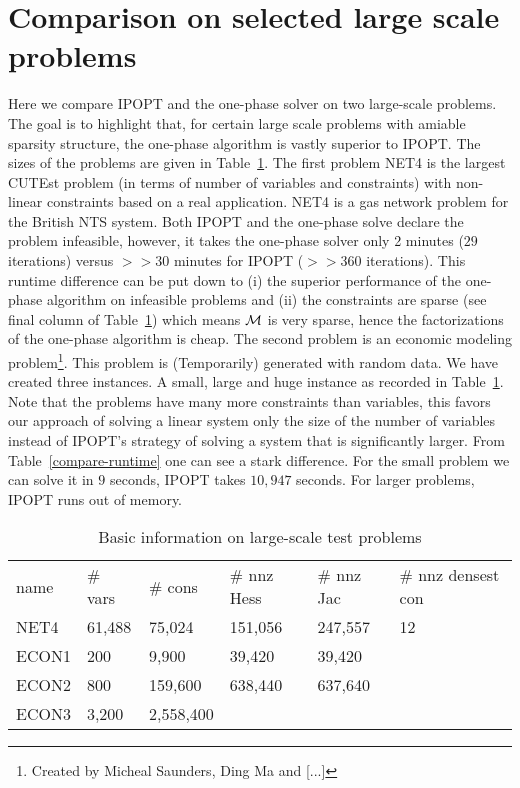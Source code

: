 \documentclass{article}
\begin{document}
\section{Comparison on selected large scale problems}\label{sec:large-scale}
\newcommand{\NETtimeOnePhase}{100}
\newcommand{\NETtimeIPOPT}{963}
\newcommand{\NETitOnePhase}{26}
\newcommand{\NETitIPOPT}{596}

Here we compare IPOPT and the one-phase solver on two large-scale problems. The goal is to highlight that, for certain large scale problems with amiable sparsity structure, the one-phase algorithm is vastly superior to IPOPT. The sizes of the problems are given in Table~\ref{large-scale:basic-info}. The first problem NET4 is the largest CUTEst problem (in terms of number of variables and constraints) with non-linear constraints based on a real application. NET4 is a gas network problem for the British NTS system. Both IPOPT and the one-phase solve declare the problem infeasible, however, it takes the one-phase solver only 2 minutes ($29$ iterations) versus $>>30$ minutes for IPOPT ($>>360$ iterations). This runtime difference can be put down to (i) the superior performance of the one-phase algorithm on infeasible problems and (ii) the constraints are sparse (see final column of Table~\ref{large-scale:basic-info}) which means $\mathcal{M}$ is very sparse, hence the factorizations of the one-phase algorithm is cheap. The second problem is an economic modeling problem\footnote{Created by Micheal Saunders, Ding Ma and [...]}. This problem is (Temporarily) generated with random data. We have created three instances. A small, large and huge instance as recorded in Table~\ref{large-scale:basic-info}. Note that the problems have many more constraints than variables, this favors our approach of solving a linear system only the size of the number of variables instead of IPOPT's strategy of solving a system that is significantly larger. From Table~\ref{compare-runtime} one can see a stark difference. For the small problem we can solve it in $9$ seconds, IPOPT takes $10,947$ seconds. For larger problems, IPOPT runs out of memory.

\begin{table}[H]
\begin{tabular}{l l l l l l}
name &  \# vars & \# cons & \# nnz Hess & \# nnz Jac & \# nnz densest con  \\ 
NET4 & 61,488 & 75,024  & 151,056 & 247,557 & 12 \\  
ECON1 &  200 & 9,900 & 39,420 & 39,420 &  \\
ECON2 & 800 & 159,600 & 638,440 & 637,640 & \\
ECON3 & 3,200 & 2,558,400 &  & 
\end{tabular}
\caption{Basic information on large-scale test problems}\label{large-scale:basic-info}
\end{table}
\end{document}
